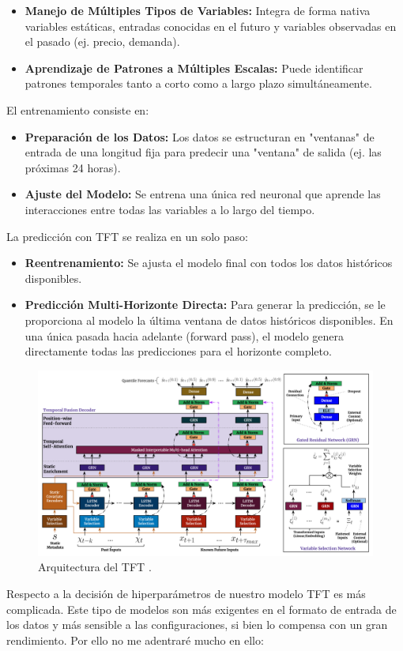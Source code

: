 \begin{itemize}
    \item \textbf{Manejo de Múltiples Tipos de Variables:} Integra de forma nativa variables estáticas, entradas conocidas en el futuro y variables observadas en el pasado (ej. precio, demanda).
    \item \textbf{Aprendizaje de Patrones a Múltiples Escalas:} Puede identificar patrones temporales tanto a corto como a largo plazo simultáneamente.
\end{itemize}
%
%
%
El entrenamiento consiste en:
%
%
%
\begin{itemize}
    \item \textbf{Preparación de los Datos:} Los datos se estructuran en "ventanas" de entrada de una longitud fija para predecir una "ventana" de salida (ej. las próximas 24 horas).
    \item \textbf{Ajuste del Modelo:} Se entrena una única red neuronal que aprende las interacciones entre todas las variables a lo largo del tiempo.
\end{itemize}
%
%
%
La predicción con TFT se realiza en un solo paso:
%
%
%
\begin{itemize}
    \item \textbf{Reentrenamiento:} Se ajusta el modelo final con todos los datos históricos disponibles.
    \item \textbf{Predicción Multi-Horizonte Directa:} Para generar la predicción, se le proporciona al modelo la última ventana de datos históricos disponibles. En una única pasada hacia adelante (forward pass), el modelo genera directamente todas las predicciones para el horizonte completo.
\end{itemize}
%
%
%
\begin{figure}[H]
    \centering
    \includegraphics[width=0.7\linewidth]{figuras/TFTarquitectura.png}
    \caption[Arquitectura de TFT]{Arquitectura del TFT \cite{TFT}.}
    \label{fig:placeholder}
\end{figure}
%
%
%
Respecto a la decisión de hiperparámetros de nuestro modelo TFT es más complicada. Este tipo de modelos son más exigentes en el formato de entrada de los datos y más sensible a las configuraciones, si bien lo compensa con un gran rendimiento. Por ello no me adentraré mucho en ello:
